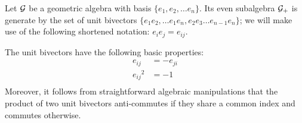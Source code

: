 \begin{lemma}
	Let $\mathcal{G}$ be a geometric algebra with basis $\{e_1, e_2, \ldots e_n\}$.
	Its even subalgebra $\mathcal{G}_+$ is generate by the set of unit bivectors $\{e_1e_2, \ldots e_1e_n, e_2e_3 \ldots e_{n-1}e_n\}$; we will make use of the following shortened notation: $e_ie_j = e_{ij}$.

	The unit bivectors have the following basic properties:
	\begin{align*}
		e_{ij} &= -e_{ji} \\
		{e_{ij}}^2 &= -1 \\
	\end{align*}
	Moreover, it follows from straightforward algebraic manipulations that the product of two unit bivectors anti-commutes if they share a common index and commutes otherwise.

\end{lemma}

